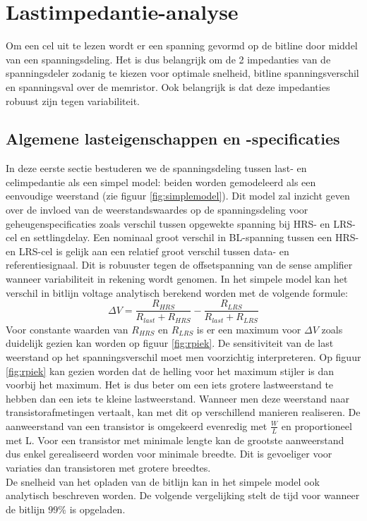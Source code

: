 \chapter{Lastimpedantie-analyse}
\label{loadanalysis}
Om een cel uit te lezen wordt er een spanning gevormd op de bitline door middel van een spanningsdeling.
Het is dus belangrijk om de 2 impedanties van de spanningsdeler zodanig te kiezen voor optimale snelheid, bitline spanningsverschil en spanningsval over de memristor.
Ook belangrijk is dat deze impedanties robuust zijn tegen variabiliteit.

\section{Algemene lasteigenschappen en -specificaties}\label{sec:simplemodel}
In deze eerste sectie bestuderen we de spanningsdeling tussen last- en celimpedantie als een simpel model: beiden worden gemodeleerd als een eenvoudige weerstand (zie figuur \ref{fig:simplemodel}). Dit model zal inzicht geven over de invloed van de weerstandswaardes op de spanningsdeling voor geheugenspecificaties zoals verschil tussen opgewekte spanning bij HRS- en LRS-cel en settlingdelay.
Een nominaal groot verschil in BL-spanning tussen een HRS- en LRS-cel is gelijk aan een relatief groot verschil tussen data- en referentiesignaal. Dit is robuuster tegen de offsetspanning van de sense amplifier wanneer variabiliteit in rekening wordt genomen. In het simpele model kan het verschil in bitlijn voltage analytisch berekend worden met de volgende formule:
\begin{equation}
 \Delta V = \frac{R_{HRS}}{R_{last}+R_{HRS}} - \frac{R_{LRS}}{R_{last}+R_{LRS}}
\end{equation} 
Voor constante waarden van $R_{HRS}$ en $R_{LRS}$ is er een maximum voor $ \Delta V$ zoals duidelijk gezien kan worden op figuur \ref{fig:rpiek}. De sensitiviteit van de last weerstand op het spanningsverschil moet men voorzichtig interpreteren. Op figuur \ref{fig:rpiek} kan gezien worden dat de helling voor het maximum stijler is dan voorbij het maximum. Het is dus beter om een iets grotere lastweerstand te hebben dan een iets te kleine lastweerstand. Wanneer men deze weerstand naar transistorafmetingen vertaalt, kan met dit op verschillend manieren realiseren. De aanweerstand van een transistor is omgekeerd evenredig met $\frac{W}{L}$ en proportioneel met L. Voor een transistor met minimale lengte kan de grootste aanweerstand dus enkel gerealiseerd worden voor minimale breedte. Dit is gevoeliger voor variaties dan transistoren met grotere breedtes.\\
De snelheid van het opladen van de bitlijn kan in het simpele model ook analytisch beschreven worden. De volgende vergelijking stelt de tijd voor wanneer de bitlijn $99\%$ is opgeladen.

